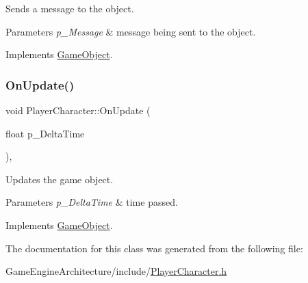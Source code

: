 Sends a message to the object. 


\begin{DoxyParams}{Parameters}
{\em p\+\_\+\+Message} & message being sent to the object. \\
\hline
\end{DoxyParams}


Implements \mbox{\hyperlink{class_game_object_a162f15f809f5181e3264b9f4d768bea2}{Game\+Object}}.

\mbox{\label{class_player_character_a8b2f1ccb7f3ae744f9ecb9a80537e5ee}} 
\subsubsection{\texorpdfstring{OnUpdate()}{OnUpdate()}}
{\footnotesize\ttfamily void Player\+Character\+::\+On\+Update (\begin{DoxyParamCaption}\item[{float}]{p\+\_\+\+Delta\+Time }\end{DoxyParamCaption})\hspace{0.3cm}{\ttfamily [override]}, {\ttfamily [virtual]}}



Updates the game object. 


\begin{DoxyParams}{Parameters}
{\em p\+\_\+\+Delta\+Time} & time passed. \\
\hline
\end{DoxyParams}


Implements \mbox{\hyperlink{class_game_object_a3d4444ab3efd5e3041014da90a66c081}{Game\+Object}}.



The documentation for this class was generated from the following file\+:\begin{DoxyCompactItemize}
\item 
Game\+Engine\+Architecture/include/\mbox{\hyperlink{_player_character_8h}{Player\+Character.\+h}}\end{DoxyCompactItemize}
